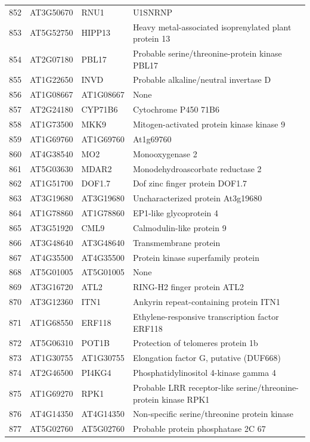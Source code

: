 \documentclass[11pt]{article}
\begin{document}
\begin{center}
\begin{tabular}{rlll}
852 & AT3G50670 & RNU1 & U1SNRNP\\
853 & AT5G52750 & HIPP13 & Heavy metal-associated isoprenylated plant protein 13\\
854 & AT2G07180 & PBL17 & Probable serine/threonine-protein kinase PBL17\\
855 & AT1G22650 & INVD & Probable alkaline/neutral invertase D\\
856 & AT1G08667 & AT1G08667 & None\\
857 & AT2G24180 & CYP71B6 & Cytochrome P450 71B6\\
858 & AT1G73500 & MKK9 & Mitogen-activated protein kinase kinase 9\\
859 & AT1G69760 & AT1G69760 & At1g69760\\
860 & AT4G38540 & MO2 & Monooxygenase 2\\
861 & AT5G03630 & MDAR2 & Monodehydroascorbate reductase 2\\
862 & AT1G51700 & DOF1.7 & Dof zinc finger protein DOF1.7\\
863 & AT3G19680 & AT3G19680 & Uncharacterized protein At3g19680\\
864 & AT1G78860 & AT1G78860 & EP1-like glycoprotein 4\\
865 & AT3G51920 & CML9 & Calmodulin-like protein 9\\
866 & AT3G48640 & AT3G48640 & Transmembrane protein\\
867 & AT4G35500 & AT4G35500 & Protein kinase superfamily protein\\
868 & AT5G01005 & AT5G01005 & None\\
869 & AT3G16720 & ATL2 & RING-H2 finger protein ATL2\\
870 & AT3G12360 & ITN1 & Ankyrin repeat-containing protein ITN1\\
871 & AT1G68550 & ERF118 & Ethylene-responsive transcription factor ERF118\\
872 & AT5G06310 & POT1B & Protection of telomeres protein 1b\\
873 & AT1G30755 & AT1G30755 & Elongation factor G, putative (DUF668)\\
874 & AT2G46500 & PI4KG4 & Phosphatidylinositol 4-kinase gamma 4\\
875 & AT1G69270 & RPK1 & Probable LRR receptor-like serine/threonine-protein kinase RPK1\\
876 & AT4G14350 & AT4G14350 & Non-specific serine/threonine protein kinase\\
877 & AT5G02760 & AT5G02760 & Probable protein phosphatase 2C 67\\

\end{tabular}
\end{center}
\end{document}
